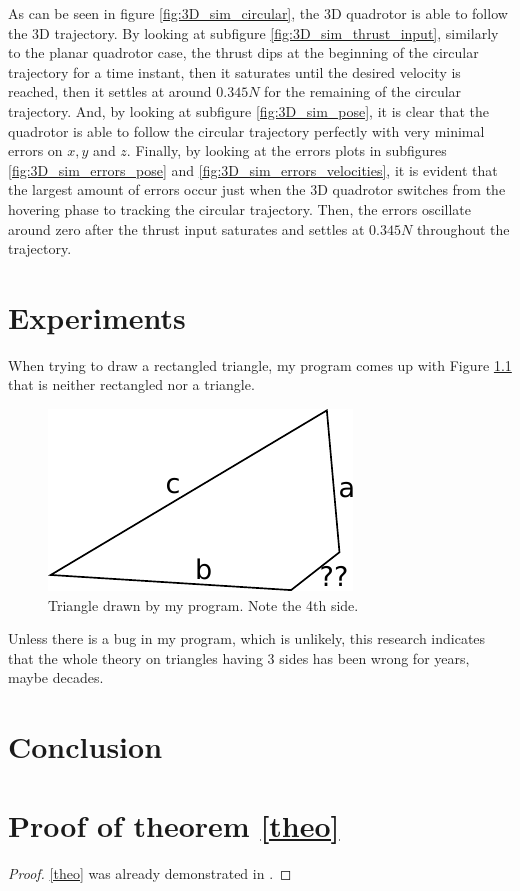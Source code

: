 \documentclass{thesisreport}
\begin{document}
\newpage 

As can be seen in figure \ref{fig:3D_sim_circular}, the 3D quadrotor is able to follow the 3D trajectory. By looking at subfigure \ref{fig:3D_sim_thrust_input}, similarly to the planar quadrotor case, the thrust dips at the beginning of the circular trajectory for a time instant, then it saturates until the desired velocity is reached, then it settles at around $0.345N$ for the remaining of the circular trajectory. And, by looking at subfigure \ref{fig:3D_sim_pose}, it is clear that the quadrotor is able to follow the circular trajectory perfectly with very minimal errors on $x,y$ and $z$. Finally, by looking at the errors plots in subfigures \ref{fig:3D_sim_errors_pose} and \ref{fig:3D_sim_errors_velocities}, it is evident that the largest amount of errors occur just when the 3D quadrotor switches from the hovering phase to tracking the circular trajectory. Then, the errors oscillate around zero after the thrust input saturates and settles at $0.345N$ throughout the trajectory.



  \chapter{Experiments}
 
 When trying to draw a rectangled triangle, my program comes up with Figure \ref{triangle2} that is neither rectangled nor a triangle.
 
  \begin{figure}[h]\centering
  \includegraphics[width=.5\linewidth]{triangle2}
  \caption{Triangle drawn by my program. Note the 4th side.} \label{triangle2}
 \end{figure}
 
Unless there is a bug in my program, which is unlikely, this research indicates that the whole theory on triangles having 3 sides has been wrong for years, maybe decades.
 

\newpage 
 
 \chapter*{Conclusion}
 
 
 \appendix	
 
 \chapter{Proof of theorem \ref{theo}}
 \label{sec:prooftheorem}
 
 
 \begin{proof}
\eqref{theo} was already demonstrated in \cite{euclides300}.
\end{proof}
 
 
 
 
 
 
 
\end{document}
